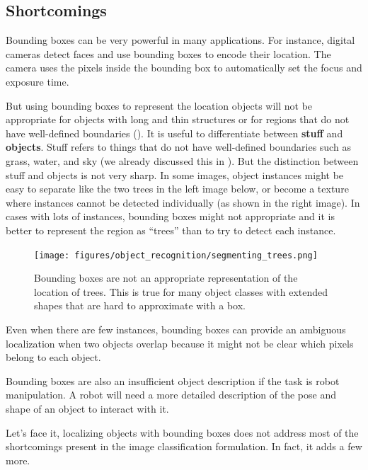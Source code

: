 \subsection{Shortcomings}

Bounding boxes can be very powerful in many applications. For instance, digital cameras detect faces and use bounding boxes to encode their location. The camera uses the pixels inside the bounding box to automatically set the focus and exposure time.

But using bounding boxes to represent the location objects will not be appropriate for objects with long and thin structures or for regions that do not have well-defined boundaries (\fig{\ref{fig:segmenting_trees}}). It is useful to differentiate between {\bf stuff} and {\bf objects}. Stuff refers to things that do not have well-defined boundaries such as grass, water, and sky (we already discussed this in \chap{\ref{chap:textures}}). But the distinction between stuff and objects is not very sharp. In some images, object instances might be easy to separate like the two trees in the left image below, or become a texture where instances cannot be detected individually (as shown in the right image). In cases with lots of instances, bounding boxes might not appropriate and it is better to represent the region as ``trees'' than to try to detect each instance.  

\begin{figure}
\centerline{
\texttt{[image: figures/object\_recognition/segmenting\_trees.png]}
}
\caption{Bounding boxes are not an appropriate representation of the location of trees. This is true for many object classes with extended shapes that are hard to approximate with a box.}
\label{fig:segmenting_trees}
\end{figure}

Even when there are few instances, bounding boxes can provide an ambiguous localization when two objects overlap because it might not be clear which pixels belong to each object. 

Bounding boxes are also an insufficient object description if the task is robot manipulation. A robot will need a more detailed description of the pose and shape of an object to interact with it. 

Let's face it, localizing objects with bounding boxes does not address most of the shortcomings present in the image classification formulation. In fact, it adds a few more.
		

